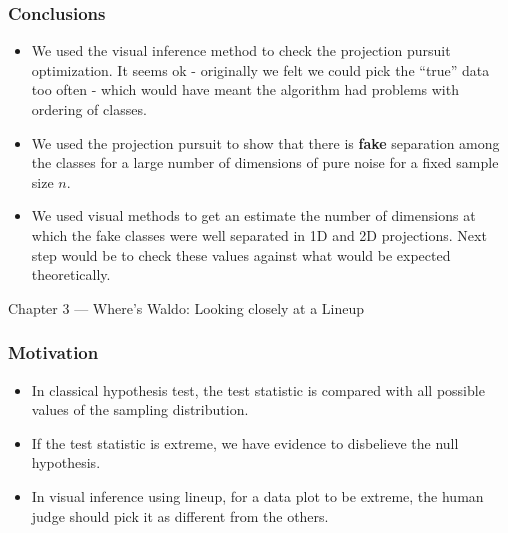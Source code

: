 \documentclass{beamer}
\begin{document}

\begin{frame}
\frametitle{Conclusions}
\begin{itemize}
\item We used the visual inference method to check the projection pursuit optimization. It seems ok - originally we felt we could pick the ``true'' data too often - which would have meant the algorithm had problems with ordering of classes.
\item We used the projection pursuit to show that there is {\bf fake} separation among the classes for a large number of dimensions of pure noise for a fixed sample size $n$.
\item We used visual methods to get an estimate the number of dimensions at which the fake classes were well separated in 1D and 2D projections. Next step would be to check these values against what would be expected theoretically.
\end{itemize}
\end{frame}

\begin{frame}
\begin{block}{}
\begin{center} \Large{Chapter 3 --- Where's Waldo: Looking closely at a Lineup} \end{center}
\end{block}
\end{frame}

\begin{frame}
\frametitle{Motivation}
\begin{itemize}
\item In classical hypothesis test, the test statistic is compared with all possible values of the sampling distribution.
\item If the test statistic is extreme, we have evidence to disbelieve the null hypothesis.
\item In visual inference using lineup, for a data plot to be extreme, the human judge should pick it as different from the others.
\end{itemize}
\end{frame}
\end{document}
